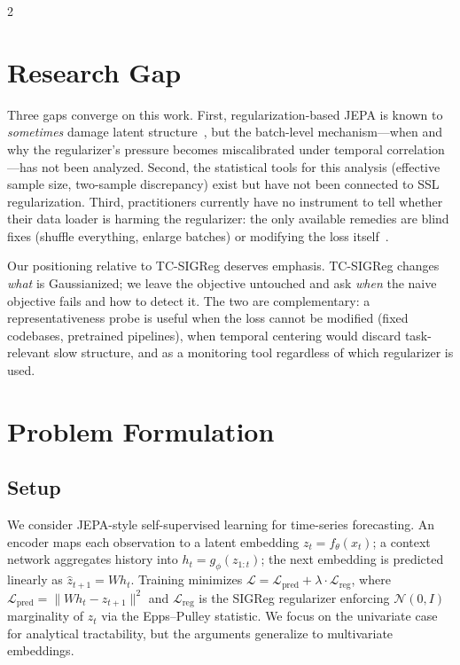 \documentclass[10pt]{article}
\theoremstyle{remark}
\begin{document}
\begin{multicols*}{2}
\section{Research Gap}
\label{sec:gap}

Three gaps converge on this work. First, regularization-based JEPA is known to \emph{sometimes} damage latent structure~\cite{klindt2026lejepa,liu2026tclwm}, but the batch-level mechanism---when and why the regularizer's pressure becomes miscalibrated under temporal correlation---has not been analyzed. Second, the statistical tools for this analysis (effective sample size, two-sample discrepancy) exist but have not been connected to SSL regularization. Third, practitioners currently have no instrument to tell whether their data loader is harming the regularizer: the only available remedies are blind fixes (shuffle everything, enlarge batches) or modifying the loss itself~\cite{liu2026tclwm}.

Our positioning relative to TC-SIGReg deserves emphasis. TC-SIGReg changes \emph{what} is Gaussianized; we leave the objective untouched and ask \emph{when} the naive objective fails and how to detect it. The two are complementary: a representativeness probe is useful when the loss cannot be modified (fixed codebases, pretrained pipelines), when temporal centering would discard task-relevant slow structure, and as a monitoring tool regardless of which regularizer is used.

\section{Problem Formulation}
\label{sec:formulation}

\subsection{Setup}

We consider JEPA-style self-supervised learning for time-series forecasting. An encoder maps each observation to a latent embedding $z_t = f_\theta(x_t)$; a context network aggregates history into $h_t = g_\phi(z_{1:t})$; the next embedding is predicted linearly as $\hat{z}_{t+1} = W h_t$. Training minimizes $\mathcal{L} = \mathcal{L}_{\text{pred}} + \lambda \cdot \mathcal{L}_{\text{reg}}$, where $\mathcal{L}_{\text{pred}} = \|W h_t - z_{t+1}\|^2$ and $\mathcal{L}_{\text{reg}}$ is the SIGReg regularizer enforcing $\mathcal{N}(0,I)$ marginality of $z_t$ via the Epps--Pulley statistic. We focus on the univariate case for analytical tractability, but the arguments generalize to multivariate embeddings.


\end{multicols*}
\end{document}

